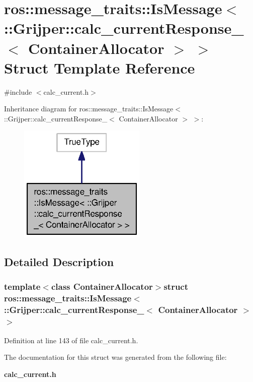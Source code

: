 \section{ros\-:\-:message\-\_\-traits\-:\-:Is\-Message$<$ \-:\-:Grijper\-:\-:calc\-\_\-current\-Response\-\_\-$<$ Container\-Allocator $>$ $>$ Struct Template Reference}
\label{structros_1_1message__traits_1_1IsMessage_3_01_1_1Grijper_1_1calc__currentResponse___3_01ContainerAllocator_01_4_01_4}


{\ttfamily \#include $<$calc\-\_\-current.\-h$>$}



Inheritance diagram for ros\-:\-:message\-\_\-traits\-:\-:Is\-Message$<$ \-:\-:Grijper\-:\-:calc\-\_\-current\-Response\-\_\-$<$ Container\-Allocator $>$ $>$\-:\nopagebreak
\begin{figure}[H]
\begin{center}
\leavevmode
\includegraphics[width=172pt]{structros_1_1message__traits_1_1IsMessage_3_01_1_1Grijper_1_1calc__currentResponse___3_01Contain3034eedc3a95f363e83a9d4c4febcb75}
\end{center}
\end{figure}


\subsection{Detailed Description}
\subsubsection*{template$<$class Container\-Allocator$>$struct ros\-::message\-\_\-traits\-::\-Is\-Message$<$ \-::\-Grijper\-::calc\-\_\-current\-Response\-\_\-$<$ Container\-Allocator $>$ $>$}



Definition at line 143 of file calc\-\_\-current.\-h.



The documentation for this struct was generated from the following file\-:\begin{DoxyCompactItemize}
\item 
{\bf calc\-\_\-current.\-h}\end{DoxyCompactItemize}
